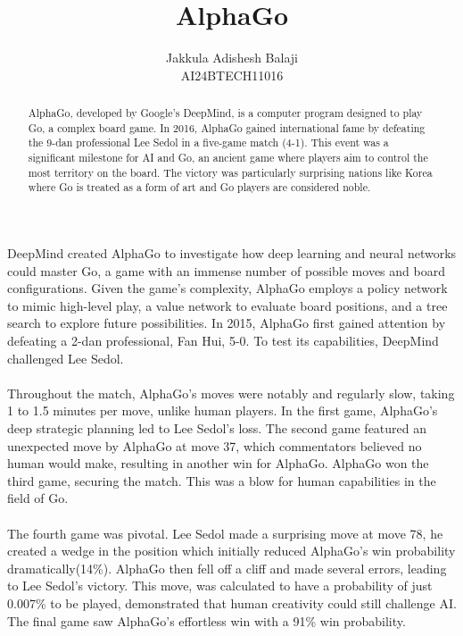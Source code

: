 \documentclass[final]{article}
\title{AlphaGo}
\author{
	Jakkula Adishesh Balaji \\
	AI24BTECH11016 \\ 
	}
\begin{document}
\maketitle

\begin{abstract}
AlphaGo, developed by Google's DeepMind, is a computer program designed to play Go, a complex board game. In 2016, AlphaGo gained international fame by defeating the 9-dan professional Lee Sedol in a five-game match (4-1). This event was a significant milestone for AI and Go, an ancient game where players aim to control the most territory on the board. The victory was particularly surprising nations like Korea where Go is treated as a form of art and Go players are considered noble.
\end{abstract}

\paragraph{}
DeepMind created AlphaGo to investigate how deep learning and neural networks could master Go, a game with an immense number of possible moves and board configurations. Given the game’s complexity, AlphaGo employs a policy network to mimic high-level play, a value network to evaluate board positions, and a tree search to explore future possibilities. In 2015, AlphaGo first gained attention by defeating a 2-dan professional, Fan Hui, 5-0. To test its capabilities, DeepMind challenged Lee Sedol.

\paragraph{}
Throughout the match, AlphaGo's moves were notably and regularly slow, taking 1 to 1.5 minutes per move, unlike human players. In the first game, AlphaGo's deep strategic planning led to Lee Sedol's loss. The second game featured an unexpected move by AlphaGo at move 37, which commentators believed no human would make, resulting in another win for AlphaGo. AlphaGo won the third game, securing the match. This was a blow for human capabilities in the field of Go.

\paragraph{}
The fourth game was pivotal. Lee Sedol made a surprising move at move 78, he created a wedge in the position which initially reduced AlphaGo’s win probability dramatically(14\%). AlphaGo then fell off a cliff and made several errors, leading to Lee Sedol's victory. This move, was calculated to have a probability of just 0.007\% to be played, demonstrated that human creativity could still challenge AI. The final game saw AlphaGo’s effortless win with a 91\% win probability.
\end{document}
